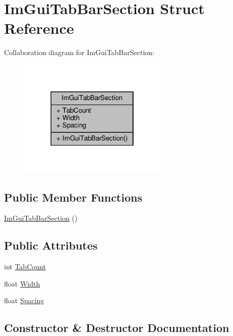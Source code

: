 \hypertarget{structImGuiTabBarSection}{}\section{Im\+Gui\+Tab\+Bar\+Section Struct Reference}
\label{structImGuiTabBarSection}


Collaboration diagram for Im\+Gui\+Tab\+Bar\+Section\+:
\nopagebreak
\begin{figure}[H]
\begin{center}
\leavevmode
\includegraphics[width=202pt]{structImGuiTabBarSection__coll__graph}
\end{center}
\end{figure}
\subsection*{Public Member Functions}
\begin{DoxyCompactItemize}
\item 
\hyperlink{structImGuiTabBarSection_afc668f275240eca04533231081023f33}{Im\+Gui\+Tab\+Bar\+Section} ()
\end{DoxyCompactItemize}
\subsection*{Public Attributes}
\begin{DoxyCompactItemize}
\item 
int \hyperlink{structImGuiTabBarSection_aa9020f621f8429e919c005c9a940b070}{Tab\+Count}
\item 
float \hyperlink{structImGuiTabBarSection_aad93edbb11bab3bb69a267a4239a7954}{Width}
\item 
float \hyperlink{structImGuiTabBarSection_a6fbf7f96db5e422c0c672a5a0943ba91}{Spacing}
\end{DoxyCompactItemize}


\subsection{Constructor \& Destructor Documentation}
\mbox{\label{structImGuiTabBarSection_afc668f275240eca04533231081023f33}} 
